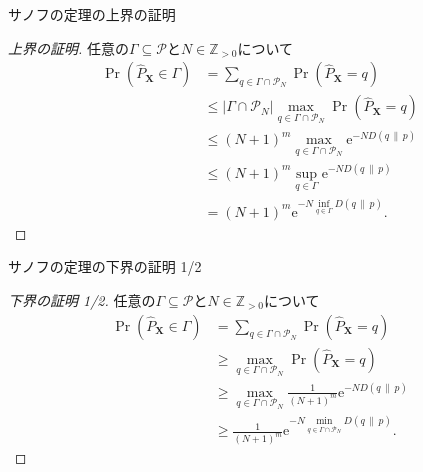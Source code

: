 \documentclass[lualatex,handout]{beamer}
\newcommand\KL[2]{D(#1\,\|\,#2)}
\theoremstyle{definition}
\begin{document}
\begin{frame}{サノフの定理の上界の証明}
\footnotesize
\sanov
\begin{proof}[\small 上界の証明]
任意の$\Gamma\subseteq\mathcal{P}$と$N\in\mathbb{Z}_{>0}$について
\begin{align*}
\Pr(\widehat{P}_{\symbf{X}}\in\Gamma) &= \sum_{q\in\Gamma\cap\mathcal{P}_N} \Pr(\widehat{P}_{\symbf{X}} = q)\\
 &\le |\Gamma\cap\mathcal{P}_N| \max_{q\in\Gamma\cap\mathcal{P}_N}\Pr(\widehat{P}_{\symbf{X}} = q)\\
 &\le (N+1)^m \max_{q\in\Gamma\cap\mathcal{P}_N}\mathrm{e}^{-N\KL{q}{p}}\\
 &\le (N+1)^m \sup_{q\in\Gamma}\mathrm{e}^{-N\KL{q}{p}}\\
 &= (N+1)^m \mathrm{e}^{-N\inf_{q\in\Gamma}\KL{q}{p}}.
\end{align*}
\end{proof}
\end{frame}


\begin{frame}{サノフの定理の下界の証明 1/2}
\footnotesize
\sanov
\begin{proof}[\small 下界の証明 1/2]
任意の$\Gamma\subseteq\mathcal{P}$と$N\in\mathbb{Z}_{>0}$について
\begin{align*}
\Pr(\widehat{P}_{\symbf{X}}\in\Gamma) &= \sum_{q\in\Gamma\cap\mathcal{P}_N} \Pr(\widehat{P}_{\symbf{X}} = q)\\
 &\ge \max_{q\in\Gamma\cap\mathcal{P}_N}\Pr(\widehat{P}_{\symbf{X}} = q)\\
 &\ge \max_{q\in\Gamma\cap\mathcal{P}_N}\frac1{(N+1)^m}\mathrm{e}^{-N\KL{q}{p}}\\
 &\ge \frac1{(N+1)^m}\mathrm{e}^{-N\min_{q\in\Gamma\cap\mathcal{P}_N}\KL{q}{p}}.
\end{align*}
\end{proof}
\end{frame}
\end{document}
